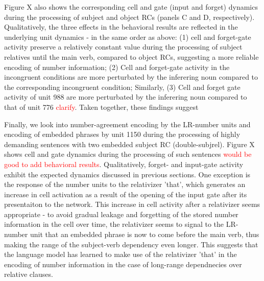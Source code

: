 Figure X also shows the corresponding cell and gate (input and forget) dynamics during the processing of subject and object RCs (panels C and D, respectively). Qualitatively, the three effects in the behavioral results are reflected in the underlying unit dynamics - in the same order as above: (1) cell and forget-gate activity preserve a relatively constant value during the processing of subject relatives until the main verb, compared to object RCs, suggesting a more reliable encoding of number information; (2) Cell and forget-gate activity in the incongruent conditions are more perturbated by the inferering noun compared to the corresponding incongruent condition; Similarly, (3) Cell and forget gate activity of unit 988 are more perturbated by the inferering noun compared to that of unit 776 \textcolor{Red}{clarify}. Taken together, these findings suggest 

Finally, we look into number-agreement encoding by the LR-number units and encoding of embedded phrases by unit 1150 during the processing of highly demanding sentences with two embedded subject RC (double-subjrel). Figure X shows cell and gate dynamics during the processing of such sentences \textcolor{red}{would be good to add behavioral results}. Qualitatively, forget- and input-gate activity exhibit the expected dynamics discussed in previous sections. One exception is the response of the number units to the relativizer 'that', which generates an increase in cell activation as a result of the opening of the input gate after its presentaiton to the network. This increase in cell activity after a relativizer seems appropriate - to avoid gradual leakage and forgetting of the stored number information in the cell over time, the relativizer seems to signal to the LR-number unit that an embedded phrase is now to come before the main verb, thus making the range of the subject-verb dependency even longer. This suggests that the language model has learned to make use of the relativizer 'that' in the encoding of number information in the case of long-range dependnecies over relative clauses.
